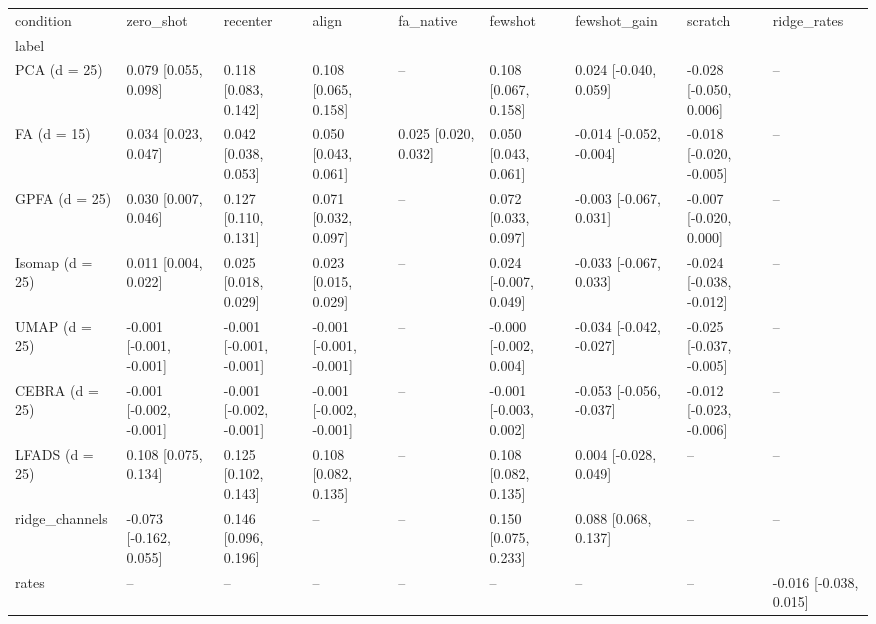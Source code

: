 \begin{tabular}{lllllllll}
\toprule
condition & zero\_shot & recenter & align & fa\_native & fewshot & fewshot\_gain & scratch & ridge\_rates \\
label &  &  &  &  &  &  &  &  \\
\midrule
PCA (d = 25) & 0.079 [0.055, 0.098] & 0.118 [0.083, 0.142] & 0.108 [0.065, 0.158] & -- & 0.108 [0.067, 0.158] & 0.024 [-0.040, 0.059] & -0.028 [-0.050, 0.006] & -- \\
FA (d = 15) & 0.034 [0.023, 0.047] & 0.042 [0.038, 0.053] & 0.050 [0.043, 0.061] & 0.025 [0.020, 0.032] & 0.050 [0.043, 0.061] & -0.014 [-0.052, -0.004] & -0.018 [-0.020, -0.005] & -- \\
GPFA (d = 25) & 0.030 [0.007, 0.046] & 0.127 [0.110, 0.131] & 0.071 [0.032, 0.097] & -- & 0.072 [0.033, 0.097] & -0.003 [-0.067, 0.031] & -0.007 [-0.020, 0.000] & -- \\
Isomap (d = 25) & 0.011 [0.004, 0.022] & 0.025 [0.018, 0.029] & 0.023 [0.015, 0.029] & -- & 0.024 [-0.007, 0.049] & -0.033 [-0.067, 0.033] & -0.024 [-0.038, -0.012] & -- \\
UMAP (d = 25) & -0.001 [-0.001, -0.001] & -0.001 [-0.001, -0.001] & -0.001 [-0.001, -0.001] & -- & -0.000 [-0.002, 0.004] & -0.034 [-0.042, -0.027] & -0.025 [-0.037, -0.005] & -- \\
CEBRA (d = 25) & -0.001 [-0.002, -0.001] & -0.001 [-0.002, -0.001] & -0.001 [-0.002, -0.001] & -- & -0.001 [-0.003, 0.002] & -0.053 [-0.056, -0.037] & -0.012 [-0.023, -0.006] & -- \\
LFADS (d = 25) & 0.108 [0.075, 0.134] & 0.125 [0.102, 0.143] & 0.108 [0.082, 0.135] & -- & 0.108 [0.082, 0.135] & 0.004 [-0.028, 0.049] & -- & -- \\
ridge\_channels & -0.073 [-0.162, 0.055] & 0.146 [0.096, 0.196] & -- & -- & 0.150 [0.075, 0.233] & 0.088 [0.068, 0.137] & -- & -- \\
rates & -- & -- & -- & -- & -- & -- & -- & -0.016 [-0.038, 0.015] \\
\bottomrule
\end{tabular}
